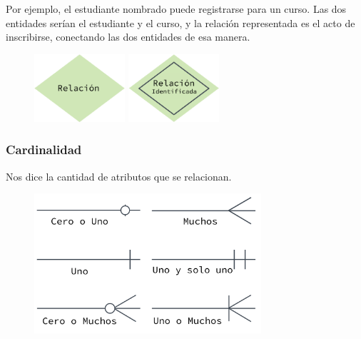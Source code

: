 \documentclass[12pt, fleqn]{report}                             %
\begin{document}
                Por ejemplo, el estudiante nombrado puede registrarse para un curso.
                Las dos entidades serían el estudiante y el curso, y la relación representada es
                el acto de inscribirse, conectando las dos entidades de esa manera. 

                \begin{figure}[h]
                    \centering
                    \includegraphics[width=0.30\textwidth]{Relacion}
                    \includegraphics[width=0.30\textwidth]{RelacionIdentificada}
                \end{figure}


            \subsubsection{Cardinalidad}

                Nos dice la cantidad de atributos que se relacionan.


                \begin{figure}[h]
                    \centering
                    \includegraphics[width=0.75\textwidth]{Cardinalidad}
                \end{figure}
\end{document}
